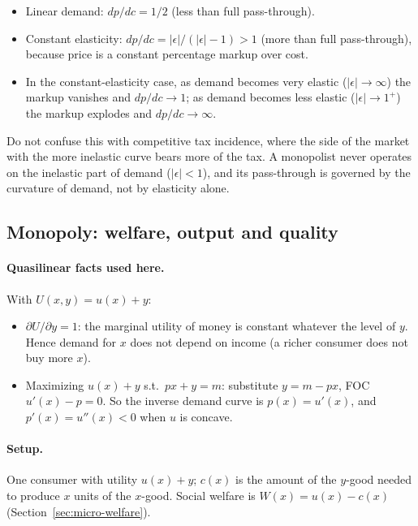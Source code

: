\begin{keybox}[title=Pass-through of a cost increase under monopoly]
\begin{itemize}
\item Linear demand: $dp/dc=1/2$ (less than full pass-through).
\item Constant elasticity: $dp/dc=|\epsilon|/(|\epsilon|-1)>1$ (more than full pass-through), because price is a constant percentage markup over cost.
\item In the constant-elasticity case, as demand becomes very elastic ($|\epsilon|\to\infty$) the markup vanishes and $dp/dc\to 1$; as demand becomes less elastic ($|\epsilon|\to 1^+$) the markup explodes and $dp/dc\to\infty$.
\end{itemize}
\end{keybox}

\begin{tipbox}
Do not confuse this with competitive tax incidence, where the side of the market with the more inelastic curve bears more of the tax. A monopolist never operates on the inelastic part of demand ($|\epsilon|<1$), and its pass-through is governed by the curvature of demand, not by elasticity alone.
\end{tipbox}

\subsection{Monopoly: welfare, output and quality }

\paragraph{Quasilinear facts used here.} With $U(x,y)=u(x)+y$:
\begin{itemize}
\item $\partial U/\partial y=1$: the marginal utility of money is constant whatever the level of $y$. Hence demand for $x$ does not depend on income (a richer consumer does not buy more $x$).
\item Maximizing $u(x)+y$ s.t.\ $px+y=m$: substitute $y=m-px$, FOC $u'(x)-p=0$. So the inverse demand curve is $p(x)=u'(x)$, and $p'(x)=u''(x)<0$ when $u$ is concave.
\end{itemize}

\paragraph{Setup.} One consumer with utility $u(x)+y$; $c(x)$ is the amount of the $y$-good needed to produce $x$ units of the $x$-good. Social welfare is $W(x)=u(x)-c(x)$ (Section~\ref{sec:micro-welfare}).

